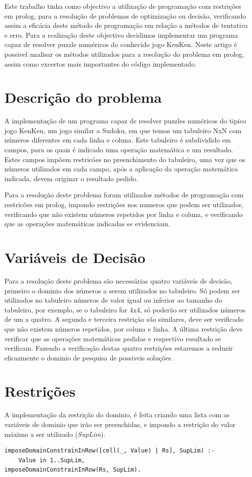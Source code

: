 \documentclass[runningheads,a4paper]{llncs}
\begin{document}
Este trabalho tinha como objectivo a utilização de programação com restrições em prolog, para a resolução de problemas de optimização ou decisão, verificando assim a eficácia deste método de programação em relação a métodos de tentativa e erro.
Para a realização deste objectivo decidimos implementar um programa capaz de resolver puzzle numéricos do conhecido jogo KenKen.
Neste artigo é possivel analisar os métodos utilizados para a resolução do problema em prolog, assim como excertos mais importantes do código implementado.


\section{Descrição do problema}
A implementação de um programa capaz de resolver puzzles numéricos do tipico jogo KenKen, um jogo similar a Sudoku, em que temos um tabuleiro NxN com números diferentes em cada linha e coluna. Este tabuleiro é subdividido em campos, para os quais é indicado uma operação matemática e um resultado. Estes campos impôem restricões no preenchimento do tabuleiro, uma vez que os números utilizados em cada campo, após a aplicação da operação matemática indicada, devem originar o resultado pedido.


Para a resolução deste problema foram utilizados métodos de programação com restricões em prolog, impondo restrições nos numeros que podem ser utilizados, verificando que não existem números repetidos por linha e coluna, e verificando que as operações matemáticas indicadas se evidenciam.

\section{Variáveis de Decisão}
Para a resolução deste problema são necessárias quatro variáveis de decisão, primeiro o dominio dos números a serem utilizados no tabuleiro. Só podem ser utilizados no tabuleiro números de valor igual ou inferior ao tamanho do tabuleiro, por exemplo, se o tabuleiro for 4x4, só poderão ser utilizados números de um a quatro.
A segunda e terceira restrição são similares, deve ser verificado que não existem números repetidos, por coluna e linha.
A última restrição deve verificar que as operações matemáticas pedidas e respectivo resultado se verificam.
Fazendo a verificação destas quatro restrições estaremos a reduzir eficazmente o dominio de pesquisa de possiveis soluções.

\newpage
\section{Restrições}
A implementação da restrição do dominio, é feita criando uma lista com as variáveis de dominio que irão ser preenchidas, e impondo a restrição do valor máximo a ser utilizado (\emph{SupLim}).
\noindent
\begin{verbatim}
imposeDomainConstrainInRow([cell(_, Value) | Rs], SupLim) :- 
	Value in 1..SupLim,										 					 				imposeDomainConstrainInRow(Rs, SupLim).
\end{verbatim}
\end{document}
